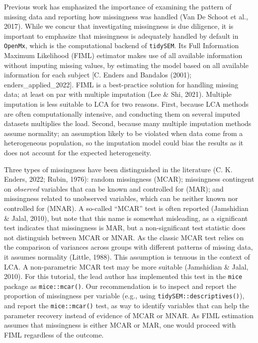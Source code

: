 \documentclass[
  ,man,floatsintext]{apa6}
\begin{document}
Previous work has emphasized the importance of examining the pattern of
missing data and reporting how missingness was handled
(Van De Schoot et al., 2017).
While we concur that investigating missingness is due diligence,
it is important to emphasize that missingness is adequately handled by default in \texttt{OpenMx}, which is the computational backend of \texttt{tidySEM}.
Its Full Information Maximum Likelihood (FIML) estimator makes use of all available
information without imputing missing values, by estimating the model based on all
available information for each subject {[}C. Enders and Bandalos (2001); enders\_applied\_2022{]}.
FIML is a best-practice solution for handling missing data;
at least on par with multiple imputation (Lee \& Shi, 2021).
Multiple imputation is less suitable to LCA for two reasons. First,
because LCA methods are often computationally intensive,
and conducting them on several imputed datasets multiplies the load.
Second, because many multiple imputation methods assume normality; an assumption likely to be violated when data come from a heterogeneous population, so the imputation model could bias the results as it does not account for the expected heterogeneity.

Three types of missingness have
been distinguished in the literature (C. K. Enders, 2022; Rubin, 1976): random missingness (MCAR);
missingness contingent on \emph{observed} variables that can be known and controlled for (MAR);
and missingness related to unobserved variables,
which can be neither known nor controlled for (MNAR).
A so-called ``MCAR'' test is often reported (Jamshidian \& Jalal, 2010),
but note that this name is somewhat misleading,
as a significant test indicates that missingness is MAR,
but a non-significant test statistic does not distinguish between MCAR or MNAR.
As the classic MCAR test relies on the comparison of variances across groups with different patterns of missing data, it assumes normality (Little, 1988).
This assumption is tenuous in the context of LCA.
A non-parametric MCAR test may be more suitable (Jamshidian \& Jalal, 2010).
For this tutorial,
the lead author has implemented this test in the \texttt{mice} package as \texttt{mice::mcar()}.
Our recommendation is to inspect and report the proportion of missingness per variable (e.g., using \texttt{tidySEM::descriptives()}),
and report the \texttt{mice::mcar()} test, as way to identify variables that can help the parameter recovery instead of evidence of MCAR or MNAR.
As FIML estimation assumes that missingness is either MCAR or MAR,
one would proceed with FIML regardless of the outcome.
\end{document}

